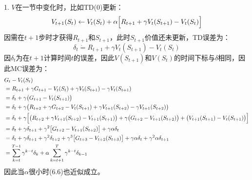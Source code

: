 \documentclass{ctexart}
\begin{document}
1. $V$在一节中变化时，比如TD(0)更新：
    \begin{equation}
   V_{t+1}(S_t) \leftarrow V_t(S_t) + \alpha\Bigl[ R_{t+1}+\gamma V_t{(S_{t+1})} -V_t(S_t) \Bigr]
   \end{equation}
   因需在$t+1$步时才获得$R_{t+1}$和$S_{t+1}$，此时$S_{t+1}$价值还未更新，TD误差为：
   \begin{equation}
   \delta_t \dot= R_{t+1} + \gamma V_t(S_{t+1}) - V_t(S_t)
   \end{equation}
   因$\delta_t$为在$t+1$计算时间$t$的误差，因此$V(S_{t+1})$和$V(S_t)$的时间下标与$\delta$相同，因此MC误差为：
   \begin{align*}
   &G_t - V_t(S_t)\\
   &= R_{t+1} + \gamma G_{t+1} - V_t(S_t) +\gamma V_t(S_{t+1}) - \gamma V_t(S_{t+1})\\
   &= \delta_t +\gamma\bigl(G_{t+1}-V_t(S_{t+1})\bigr)\\
   &= \delta_t + \gamma\bigl(R_{t+2}+\gamma G_{t+2} - V_t(S_{t+1})+\gamma V_{t+1}(S_{t+2})-\gamma V_{t+1}(S_{t+2})\bigr)\\
   &= \delta_t + \gamma\Bigl[\bigl( R_{t+2}+\gamma V_{t+1}(S_{t+2})-V_{t+1}(S_{t+1})\bigr) + \gamma\bigl(G_{t+2}-V_{t+1}(S_{t+2})\bigr) +\bigl(V_{t+1}(S_{t+1})-V_t(S_{t+1})\bigr) \Bigr]\\
   &= \delta_t + \gamma\delta_{t+1} + \gamma^2\bigl[G_{t+2}-V_{t+1}(S_{t+2})\bigr] + \gamma\alpha\delta_t\\
   &= \delta_t+\gamma\delta_{t+1} + \gamma^2\delta_{t+2} +\gamma^3\bigl[G_{t+3}-V_{t+2}(S_{t+3})\bigr] +\gamma\alpha\delta_t +\gamma^2\alpha\delta_{t+1}\\
   &= \sum_{k=t}^{T-1}\gamma^{k-t}\delta_k + \alpha\sum_{k=t+1}^T\gamma^{k-t}\delta_{k-1}
   \end{align*}
   因此当$\alpha$很小时(6.6)也近似成立。

   ​
\end{document}
